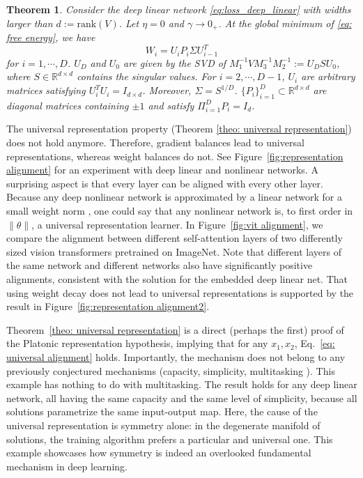 \documentclass{article}
\theoremstyle{plain}
\newtheorem{theorem}{Theorem}
\begin{document}
\begin{theorem}
\label{theo:deep_linear_wd}
Consider the deep linear network \eqref{eq:loss_deep_linear} with widths larger than $d:=\text{rank}(V)$. Let $\eta=0$ and $\gamma\to0_+$. At the global minimum of \eqref{eq: free energy}, we have
\begin{equation}
W_i=U_iP_i\Sigma U_{i-1}^T
\end{equation}
for $i=1,\cdots,D$. $U_D$ and $U_0$ are given by the SVD of $M_1^{-1}VM_3^{-1}M_2^{-1}:=U_DSU_0$, where $S\in\mathbb{R}^{d\times d}$ contains the singular values. For $i=2,\cdots,D-1$, $U_i$ are arbitrary matrices satisfying $U_i^TU_i=I_{d\times d}$. Moreover, $\Sigma=S^{1/D}$. $\{P_i\}_{i=1}^D\subset\mathbb{R}^{d\times d}$ are diagonal matrices containing $\pm1$ and satisfy $\Pi_{i=1}^DP_i=I_d$.
\end{theorem}
The universal representation property (Theorem \ref{theo: universal representation}) does not hold anymore. Therefore, gradient balances lead to universal representations, whereas weight balances do not. See Figure~\ref{fig:representation alignment} for an experiment with deep linear and nonlinear networks. A surprising aspect is that every layer can be aligned with every other layer. Because any deep nonlinear network is approximated by a linear network for a small weight norm \cite{ziyin2022exact}, one could say that any nonlinear network is, to first order in $\|\theta\|$, a universal representation learner. In Figure~\ref{fig:vit alignment}, we compare the alignment between different self-attention layers of two differently sized vision transformers pretrained on ImageNet. Note that different layers of the same network and different networks also have significantly positive alignments, consistent with the solution for the embedded deep linear net. That using weight decay does not lead to universal representations is supported by the result in Figure~\ref{fig:representation alignment2}.

Theorem~\ref{theo: universal representation} is a direct (perhaps the first) proof of the Platonic representation hypothesis, implying that for any $x_1, x_2$, Eq.~\eqref{eq: universal alignment} holds. Importantly, the mechanism does not belong to any previously conjectured mechanisms (capacity, simplicity, multitasking \cite{huh2024platonic}). This example has nothing to do with multitasking. The result holds for any deep linear network, all having the same capacity and the same level of simplicity, because all solutions parametrize the same input-output map. Here, the cause of the universal representation is symmetry alone: in the degenerate manifold of solutions, the training algorithm prefers a particular and universal one. This example showcases how symmetry is indeed an overlooked fundamental mechanism in deep learning.
\end{document}
